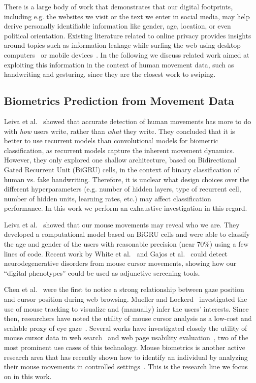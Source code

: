 \documentclass[sn-mathphys, pdflatex]{sn-jnl}
\begin{document}
There is a large body of work that demonstrates that our digital footprints,
including e.g. the websites we visit or the text we enter in social media,
may help derive personally identifiable information like gender, age, location, or even political orientation.
Existing literature related to online privacy provides insights around topics such as
information leakage while surfing the web using desktop computers~\cite{Starov_2016}
or mobile devices~\cite{Leung_2016}.
In the following we discuss related work aimed at exploiting this information
in the context of human movement data, such as handwriting and gesturing,
since they are the closest work to swiping.

\subsection{Biometrics Prediction from Movement Data}

Leiva et al.~\cite{Leiva20_biometrics} showed that accurate detection of human movements
has more to do with \emph{how} users write, rather than \emph{what} they write.
They concluded that it is better to use recurrent models than convolutional models for biometric classification,
as recurrent models capture the inherent movement dynamics.
However, they only explored one shallow architecture,
based on Bidirectional Gated Recurrent Unit (BiGRU) cells,
in the context of binary classification of human vs. fake handwriting.
Therefore, it is unclear what design choices over the different hyperparameters
(e.g. number of hidden layers, type of recurrent cell, number of hidden units, learning rates, etc.)
may affect classification performance.
In this work we perform an exhaustive investigation in this regard.

Leiva et al.~\cite{Leiva21_privacy} showed that our mouse movements may reveal who we are.
They developed a computational model based on BiGRU cells and were able to classify the age and gender of the users
with reasonable precision (near 70\%) using a few lines of code.
Recent work by White et al.~\cite{White18} and Gajos et al.~\cite{Gajos20}
could detect neurodegenerative disorders from mouse cursor movements,
showing how our ``digital phenotypes'' could be used as adjunctive screening tools.

Chen et al.~\cite{Chen_2001} were the first to notice a strong relationship between gaze position and cursor position during web browsing.
Mueller and Lockerd~\cite{Mueller01_cheese} investigated the use of mouse tracking to visualize and (manually) infer the users' interests.
Since then, researchers have noted the utility of mouse cursor analysis
as a low-cost and scalable proxy of eye gaze~\cite{Huang12_search, Huang12_align, Navalpakkam13_layout}.
Several works have investigated closely the utility of mouse cursor data in web search~\cite{Arapakis16_dds, Chen17_satisfaction, Liu15_opinions}
and web page usability evaluation~\cite{Arroyo06_usab, Atterer06_move, Leiva11_adapt},
two of the most prominent use cases of this technology.
Mouse biometrics is another active research area that has recently shown how to identify an individual
by analyzing their mouse movements in controlled settings~\cite{Kratky18_biom, Lu17_biom}.
This is the research line we focus on in this work.
\end{document}
